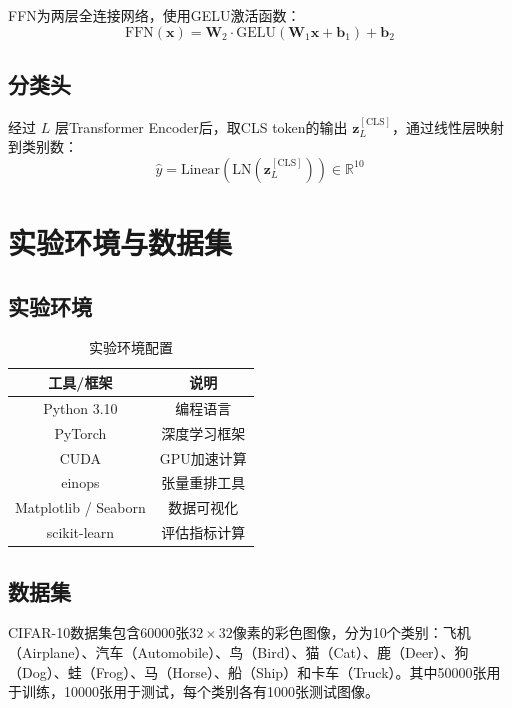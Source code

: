 \documentclass[12pt,a4paper]{article}
\begin{document}
FFN为两层全连接网络，使用GELU激活函数：
\begin{equation}
\text{FFN}(\bm{x}) = \bm{W}_2 \cdot \text{GELU}(\bm{W}_1 \bm{x} + \bm{b}_1) + \bm{b}_2
\end{equation}

\subsection{分类头}

经过 $L$ 层Transformer Encoder后，取CLS token的输出 $\bm{z}_L^{[\text{CLS}]}$，通过线性层映射到类别数：
\begin{equation}
\hat{y} = \text{Linear}(\text{LN}(\bm{z}_L^{[\text{CLS}]})) \in \mathbb{R}^{10}
\end{equation}

\section{实验环境与数据集}

\subsection{实验环境}

\begin{table}[H]
\centering
\begin{tabular}{cc}
\toprule
工具/框架 & 说明 \\
\midrule
Python 3.10 & 编程语言 \\
PyTorch & 深度学习框架 \\
CUDA & GPU加速计算 \\
einops & 张量重排工具 \\
Matplotlib / Seaborn & 数据可视化 \\
scikit-learn & 评估指标计算 \\
\bottomrule
\end{tabular}
\caption{实验环境配置}
\label{tab:environment}
\end{table}

\subsection{数据集}

CIFAR-10数据集包含60000张$32 \times 32$像素的彩色图像，分为10个类别：飞机（Airplane）、汽车（Automobile）、鸟（Bird）、猫（Cat）、鹿（Deer）、狗（Dog）、蛙（Frog）、马（Horse）、船（Ship）和卡车（Truck）。其中50000张用于训练，10000张用于测试，每个类别各有1000张测试图像。
\end{document}
